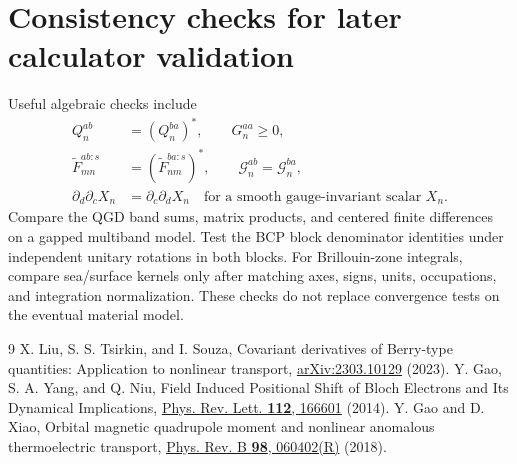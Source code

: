 \documentclass[prx,amsmath,amssymb,superscriptaddress,longbibliography]{revtex4-2}
\begin{document}
\section{Consistency checks for later calculator validation}
\label{app:checks}
Useful algebraic checks include
\begin{align}
 Q_n^{ab}&=(Q_n^{ba})^*,\qquad G_n^{aa}\ge0,\nonumber\\
 \widetilde F_{mn}^{ab:s}&=(\widetilde F_{nm}^{ba:s})^*,\qquad
 \mathcal G_n^{ab}=\mathcal G_n^{ba},\nonumber\\
 \partial_d\partial_cX_n&=\partial_c\partial_dX_n
 \quad\text{for a smooth gauge-invariant scalar }X_n.
\end{align}
Compare the QGD band sums, matrix products, and centered finite differences
on a gapped multiband model. Test the BCP block denominator identities under
independent unitary rotations in both blocks.
For Brillouin-zone integrals, compare sea/surface kernels only after matching
axes, signs, units, occupations, and integration normalization.
These checks do not replace convergence tests on the eventual material model.

\begin{thebibliography}{9}
X. Liu, S. S. Tsirkin, and I. Souza,
Covariant derivatives of Berry-type quantities: Application to nonlinear transport,
\href{https://arxiv.org/abs/2303.10129}{arXiv:2303.10129} (2023).
Y. Gao, S. A. Yang, and Q. Niu,
Field Induced Positional Shift of Bloch Electrons and Its Dynamical Implications,
\href{https://doi.org/10.1103/PhysRevLett.112.166601}{Phys. Rev. Lett. \textbf{112}, 166601} (2014).
Y. Gao and D. Xiao,
Orbital magnetic quadrupole moment and nonlinear anomalous thermoelectric transport,
\href{https://doi.org/10.1103/PhysRevB.98.060402}{Phys. Rev. B \textbf{98}, 060402(R)} (2018).
\end{thebibliography}
\end{document}
